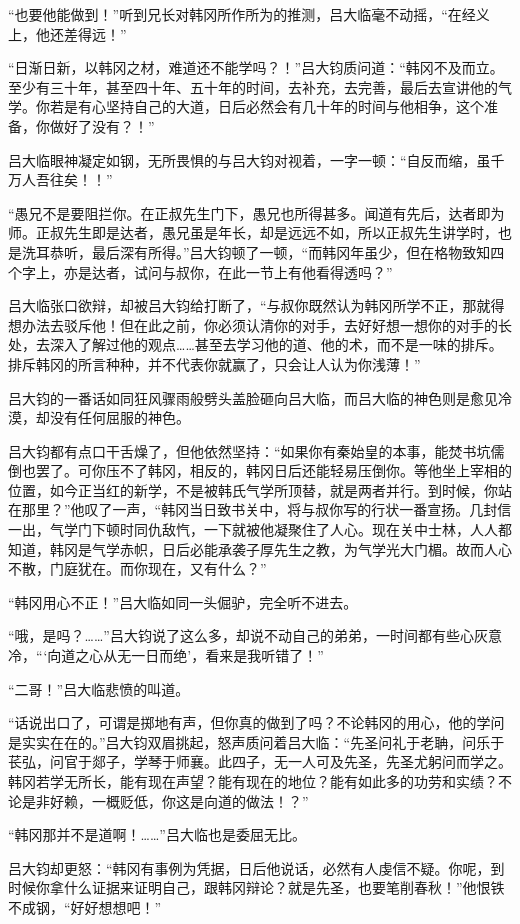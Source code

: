 “也要他能做到！”听到兄长对韩冈所作所为的推测，吕大临毫不动摇，“在经义上，他还差得远！”

“日渐日新，以韩冈之材，难道还不能学吗？！”吕大钧质问道：“韩冈不及而立。至少有三十年，甚至四十年、五十年的时间，去补充，去完善，最后去宣讲他的气学。你若是有心坚持自己的大道，日后必然会有几十年的时间与他相争，这个准备，你做好了没有？！”

吕大临眼神凝定如钢，无所畏惧的与吕大钧对视着，一字一顿：“自反而缩，虽千万人吾往矣！！”

“愚兄不是要阻拦你。在正叔先生门下，愚兄也所得甚多。闻道有先后，达者即为师。正叔先生即是达者，愚兄虽是年长，却是远远不如，所以正叔先生讲学时，也是洗耳恭听，最后深有所得。”吕大钧顿了一顿，“而韩冈年虽少，但在格物致知四个字上，亦是达者，试问与叔你，在此一节上有他看得透吗？”

吕大临张口欲辩，却被吕大钧给打断了，“与叔你既然认为韩冈所学不正，那就得想办法去驳斥他！但在此之前，你必须认清你的对手，去好好想一想你的对手的长处，去深入了解过他的观点……甚至去学习他的道、他的术，而不是一味的排斥。排斥韩冈的所言种种，并不代表你就赢了，只会让人认为你浅薄！”

吕大钧的一番话如同狂风骤雨般劈头盖脸砸向吕大临，而吕大临的神色则是愈见冷漠，却没有任何屈服的神色。

吕大钧都有点口干舌燥了，但他依然坚持：“如果你有秦始皇的本事，能焚书坑儒倒也罢了。可你压不了韩冈，相反的，韩冈日后还能轻易压倒你。等他坐上宰相的位置，如今正当红的新学，不是被韩氏气学所顶替，就是两者并行。到时候，你站在那里？”他叹了一声，“韩冈当日致书关中，将与叔你写的行状一番宣扬。几封信一出，气学门下顿时同仇敌忾，一下就被他凝聚住了人心。现在关中士林，人人都知道，韩冈是气学赤帜，日后必能承袭子厚先生之教，为气学光大门楣。故而人心不散，门庭犹在。而你现在，又有什么？”

“韩冈用心不正！”吕大临如同一头倔驴，完全听不进去。

“哦，是吗？……”吕大钧说了这么多，却说不动自己的弟弟，一时间都有些心灰意冷，“‘向道之心从无一日而绝’，看来是我听错了！”

“二哥！”吕大临悲愤的叫道。

“话说出口了，可谓是掷地有声，但你真的做到了吗？不论韩冈的用心，他的学问是实实在在的。”吕大钧双眉挑起，怒声质问着吕大临：“先圣问礼于老聃，问乐于苌弘，问官于郯子，学琴于师襄。此四子，无一人可及先圣，先圣尤躬问而学之。韩冈若学无所长，能有现在声望？能有现在的地位？能有如此多的功劳和实绩？不论是非好赖，一概贬低，你这是向道的做法！？”

“韩冈那并不是道啊！……”吕大临也是委屈无比。

吕大钧却更怒：“韩冈有事例为凭据，日后他说话，必然有人虔信不疑。你呢，到时候你拿什么证据来证明自己，跟韩冈辩论？就是先圣，也要笔削春秋！”他恨铁不成钢，“好好想想吧！”

